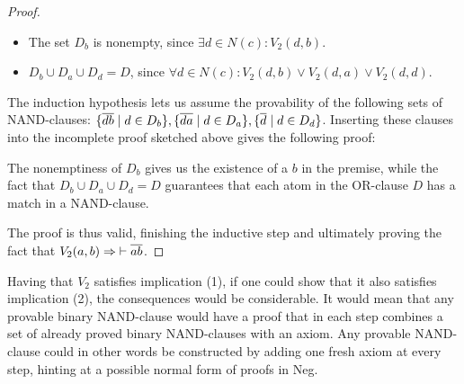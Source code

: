\begin{proof}
  \begin{itemize}
    \item The set $D_b$ is nonempty, since $\exists d \in N(c): V_2(d,b)$.
    \item $D_b \cup D_a \cup D_d = D$, since $\forall d \in N(c): V_2(d,b) \vee V_2(d,a) \vee V_2(d,d)$.
  \end{itemize}
  The induction hypothesis lets us assume the provability of the following sets of NAND-clauses:
  $\{ \ol{db} \;|\; d \in D_b \},\{ \ol{da} \;|\; d \in D_a \},\{ \ol{d} \;|\; d \in D_d \}$.
  Inserting these clauses into the incomplete proof sketched above gives the following proof:\par
  \begin{figure}[!h]
    \centering
    \begin{prooftree*}
    \end{prooftree*}
    \caption{}
    \label{fig:proof_v2}
  \end{figure}
  The nonemptiness of $D_b$ gives us the existence of a $b$ in the premise, while the fact that $D_b \cup D_a \cup D_d = D$ guarantees that each atom in the OR-clause $D$ has a match in a NAND-clause.

  The proof is thus valid, finishing the inductive step and ultimately proving the fact that $V_2(a,b) \Rightarrow \;\vdash \ol{ab}$.
\end{proof}
Having that $V_2$ satisfies implication (1), if one could show that it also satisfies implication (2), the consequences would be considerable.
It would mean that any provable binary NAND-clause would have a proof that in each step combines a set of already proved binary NAND-clauses with an axiom.
Any provable NAND-clause could in other words be constructed by adding one fresh axiom at every step, hinting at a possible normal form of proofs in Neg.

